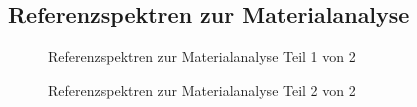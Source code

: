\documentclass[11pt, a4paper]{article}
\begin{document}
\newpage

\begin{appendix}
\section{Referenzspektren zur Materialanalyse}
\label{sec:referenzspektren}
\begin{figure}[!h]
\centering
\resizebox{\columnwidth}{!}{%
}
\caption{Referenzspektren zur Materialanalyse Teil 1 von 2}
\end{figure}

\begin{figure}[h]
\centering
\resizebox{\columnwidth}{!}{%
}
\caption{Referenzspektren zur Materialanalyse Teil 2 von 2}
\end{figure}
\end{appendix}
\end{document}

